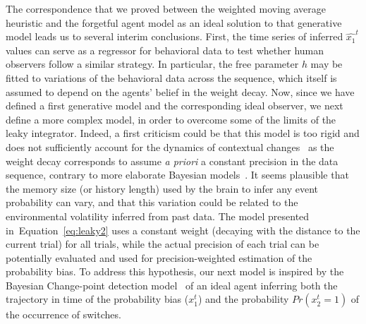 \documentclass[12pt,english]{article}%
\newcommand{\citep}[1]{\parencite{#1}}
\newcommand{\seeFig}[1]{Figure~\ref{fig:#1}}
\newcommand{\seeEq}[1]{Equation~\ref{eq:#1}}
\begin{document}
The correspondence that we proved between the weighted moving average heuristic
and the forgetful agent model as an ideal solution to that generative model leads
us to several interim conclusions.
First, the time series of inferred $\hat{x_1}^{t}$ values 
can serve as a regressor for behavioral data
to test whether human observers follow a similar strategy.
In particular, the free parameter $h$ 
may be fitted to variations of the behavioral data across the sequence, 
which itself is assumed to depend on the agents' belief in the weight decay.
Now, since we have defined a first generative model
and the corresponding ideal observer,
we next define a more complex model,
in order to overcome some of the limits of the leaky integrator.
Indeed, a first criticism could be that
this model is too rigid and does not sufficiently
account for the dynamics of contextual changes~\citep{Behrens07}
as the weight decay corresponds to assume \emph{a priori} a constant precision in the data sequence, contrary to more elaborate Bayesian models~\citep{Vilares2011}.
It seems plausible that the memory size (or history length) used by the brain 
to infer any event probability can vary, and that this variation could be related
to the environmental volatility inferred from past data.
The model presented in~\seeEq{leaky2} uses a constant weight
(decaying with the distance to the current trial)
for all trials, while the actual precision of each trial
can be potentially evaluated and used
for precision-weighted estimation of the probability bias.
To address this hypothesis, our next model is inspired
by the Bayesian Change-point detection model~\citep{AdamsMackay2007}
of an ideal agent inferring
both the trajectory in time of the probability bias ($x_1^t$)
and the probability $Pr(x_2^t=1)$ of the occurrence of switches.
\end{document}
